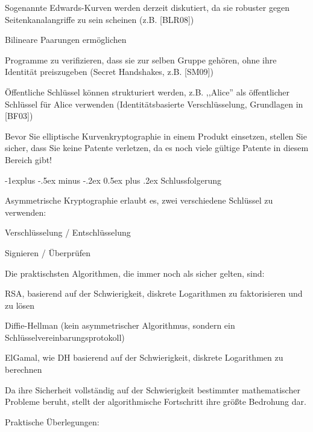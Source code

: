 \documentclass[a4paper]{article}
\makeatletter
\renewcommand{\subsection}{\@startsection{subsection}{2}{0mm}%
 {-1explus -.5ex minus -.2ex}%
 {0.5ex plus .2ex}%
 {\normalfont\normalsize\bfseries}}
\makeatother
\begin{document}
\begin{multicols}{3}
\begin{itemize*}
            \begin{itemize*}
                  \item Sogenannte Edwards-Kurven werden derzeit diskutiert, da sie robuster gegen Seitenkanalangriffe zu sein scheinen (z.B. {[}BLR08{]})
                  \item Bilineare Paarungen ermöglichen
                  \begin{itemize*} \item Programme zu verifizieren, dass sie zur selben Gruppe gehören, ohne ihre Identität preiszugeben (Secret Handshakes, z.B. {[}SM09{]}) \item Öffentliche Schlüssel können strukturiert werden, z.B. ,,Alice'' als öffentlicher Schlüssel für Alice verwenden (Identitätsbasierte Verschlüsselung, Grundlagen in {[}BF03{]}) \end{itemize*}
            \end{itemize*}
            \item
            Bevor Sie elliptische Kurvenkryptographie in einem Produkt einsetzen,
            stellen Sie sicher, dass Sie keine Patente verletzen, da es noch viele
            gültige Patente in diesem Bereich gibt!
      \end{itemize*}


      \subsection{Schlussfolgerung}

      \begin{itemize*}
            \item
            Asymmetrische Kryptographie erlaubt es, zwei verschiedene Schlüssel zu
            verwenden:

            \begin{itemize*}
                  \item Verschlüsselung / Entschlüsselung
                  \item Signieren / Überprüfen
            \end{itemize*}
            \item
            Die praktischsten Algorithmen, die immer noch als sicher gelten, sind:

            \begin{itemize*}
                  \item RSA, basierend auf der Schwierigkeit, diskrete Logarithmen zu faktorisieren und zu lösen
                  \item Diffie-Hellman (kein asymmetrischer Algorithmus, sondern ein Schlüsselvereinbarungsprotokoll)
                  \item ElGamal, wie DH basierend auf der Schwierigkeit, diskrete Logarithmen zu berechnen
            \end{itemize*}
            \item
            Da ihre Sicherheit vollständig auf der Schwierigkeit bestimmter
            mathematischer Probleme beruht, stellt der algorithmische Fortschritt
            ihre größte Bedrohung dar.
            \item
            Praktische Überlegungen:


\end{itemize*}
\end{multicols}
\end{document}
